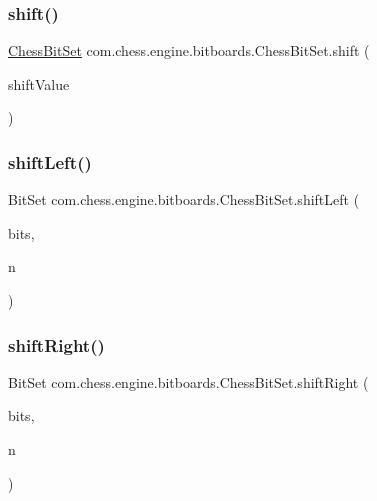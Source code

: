 \subsubsection{\texorpdfstring{shift()}{shift()}}
{\footnotesize\ttfamily \mbox{\hyperlink{classcom_1_1chess_1_1engine_1_1bitboards_1_1_chess_bit_set}{Chess\+Bit\+Set}} com.\+chess.\+engine.\+bitboards.\+Chess\+Bit\+Set.\+shift (\begin{DoxyParamCaption}\item[{final int}]{shift\+Value }\end{DoxyParamCaption})}

\mbox{\label{classcom_1_1chess_1_1engine_1_1bitboards_1_1_chess_bit_set_a7013eef007c2437dfcbc0cefdc65e3be}} 
\subsubsection{\texorpdfstring{shiftLeft()}{shiftLeft()}}
{\footnotesize\ttfamily Bit\+Set com.\+chess.\+engine.\+bitboards.\+Chess\+Bit\+Set.\+shift\+Left (\begin{DoxyParamCaption}\item[{Bit\+Set}]{bits,  }\item[{int}]{n }\end{DoxyParamCaption})}

\mbox{\label{classcom_1_1chess_1_1engine_1_1bitboards_1_1_chess_bit_set_afdbabd7fc6842544b139774471568c74}} 
\subsubsection{\texorpdfstring{shiftRight()}{shiftRight()}}
{\footnotesize\ttfamily Bit\+Set com.\+chess.\+engine.\+bitboards.\+Chess\+Bit\+Set.\+shift\+Right (\begin{DoxyParamCaption}\item[{Bit\+Set}]{bits,  }\item[{int}]{n }\end{DoxyParamCaption})}

